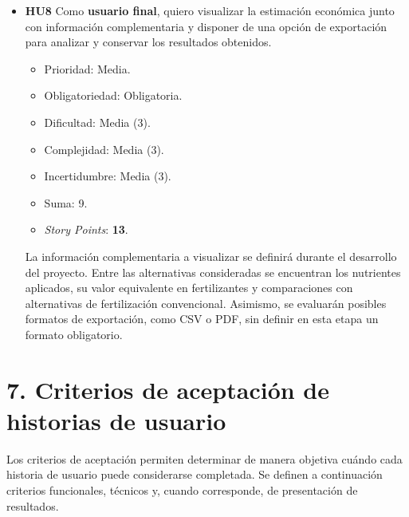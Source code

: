 \documentclass[
11pt, %
]{charter}
\begin{document}
\begin{itemize}
\begin{itemize}
      La modalidad exacta de selección de los datos previamente cargados se definirá durante el desarrollo del proyecto.

      \item \textbf{HU8} Como \textbf{usuario final}, quiero visualizar la estimación económica junto con información complementaria y disponer de una opción de exportación para analizar y conservar los resultados obtenidos.
        \begin{itemize}
          \item Prioridad: Media.
          \item Obligatoriedad: Obligatoria.
          \item Dificultad: Media (3).
          \item Complejidad: Media (3).
          \item Incertidumbre: Media (3).
          \item Suma: 9.
          \item \textit{Story Points}: \textbf{13}.
        \end{itemize}

      La información complementaria a visualizar se definirá durante el desarrollo del proyecto. Entre las alternativas consideradas se encuentran los nutrientes aplicados, su valor equivalente en fertilizantes y comparaciones con alternativas de fertilización convencional. Asimismo, se evaluarán posibles formatos de exportación, como CSV o PDF, sin definir en esta etapa un formato obligatorio.

    \end{itemize}

\end{itemize}





\section{7. Criterios de aceptación de historias de usuario}
\label{sec:criteriosAceptacion}

Los criterios de aceptación permiten determinar de manera objetiva cuándo cada historia de usuario puede considerarse completada. Se definen a continuación criterios funcionales, técnicos y, cuando corresponde, de presentación de resultados.
\end{document}
